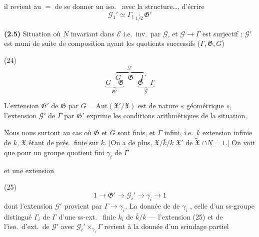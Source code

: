 \documentclass[11pt,a4paper]{article}
\begin{document}
il revient au $=$ de se donner un iso.\  avec la structure\ldots, d'écrire
\[
  \mathcal{G}_1' \simeq \Gamma_1 \underset{1/2}{\cdot} \mathfrak{G}'
\]

\textbf{(2.5)} Situation où $N$ invariant dans $\mathcal{E}$ i.e.\ inv.\ par $\mathcal{G}$, et $\mathcal{G} \to \Gamma$ est surjectif : $\mathcal{G}'$  est muni de suite de composition ayant les quotients successifs ($\Gamma, \mathfrak{G}, G$)

(24)
\[
  \overbrace{G \quad \mathfrak{G} \quad \Gamma}^{\mathcal{G}'}
\]
\[
  \underbrace{G \quad \mathfrak{G}}_{\mathfrak{G}'} \qquad
  \underbrace{\mathfrak{G} \quad \Gamma}_{\mathcal{G}}
\]

L'extension $\mathfrak{G}'$ de $\mathfrak{G}$ par $G = \mathrm{Aut}(\mathfrak{X}'/\mathfrak{X})$ est de nature « géométrique », l'extension $\mathcal{G}'$ de $\Gamma$ par $\mathfrak{G}'$ exprime les conditions arithmétiques de la situation.

Nous nous  surtout au cas où $\mathfrak{G}$ et $G$ sont finis, et $\Gamma$ infini, i.e.\ $\bar{k}$ extension infinie de $k$,  $\mathfrak{X}$  étant de prés.\ finie sur $k$. [On a de plus, $\mathfrak{X}/\bar{k}/k$ \ill{}  $\mathfrak{X}'$  de $\widetilde{\mathfrak{X}}$ \ill{} \ill{} $\cap N = 1$.] On voit \ill{} que \ill{} pour \ill{} un groupe quotient fini \struck{\ill{}} $\gamma_i$  de $\Gamma$

et une extension

(25)
\[
  1 \to \mathfrak{G}' \to \mathcal{G}_i' \to \gamma_i \to 1
\]
dont l'extension $\mathcal{G}'$ provient  par $\Gamma \to \gamma_i$. La donnée de \ill{} de $\gamma_i$ ,  celle d'un ss-groupe distingué \struck{\ill{}}  $\Gamma_i$ de $\Gamma$ \ill{} d'une ss-ext.\  finie $k_i$ \add{\struck{\ill{}}} de $\bar{k}/k$ ---  l'extension (25) et de l'iso.\ d'ext.\ de $\mathcal{G}'$ avec $\mathcal{G}_i' \times_{\gamma_i} \Gamma$ revient à la donnée d'un  scindage partiel
\end{document}
